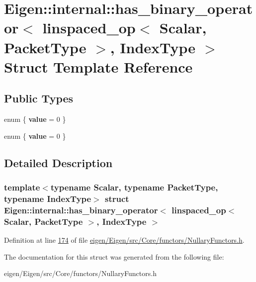 \hypertarget{struct_eigen_1_1internal_1_1has__binary__operator_3_01linspaced__op_3_01_scalar_00_01_packet_type_01_4_00_01_index_type_01_4}{}\section{Eigen\+:\+:internal\+:\+:has\+\_\+binary\+\_\+operator$<$ linspaced\+\_\+op$<$ Scalar, Packet\+Type $>$, Index\+Type $>$ Struct Template Reference}
\label{struct_eigen_1_1internal_1_1has__binary__operator_3_01linspaced__op_3_01_scalar_00_01_packet_type_01_4_00_01_index_type_01_4}
\subsection*{Public Types}
\begin{DoxyCompactItemize}
\item 
\mbox{\label{struct_eigen_1_1internal_1_1has__binary__operator_3_01linspaced__op_3_01_scalar_00_01_packet_type_01_4_00_01_index_type_01_4_aa55a2eeba226fddf3a4f283ab353f970}} 
enum \{ {\bfseries value} = 0
 \}
\item 
\mbox{\label{struct_eigen_1_1internal_1_1has__binary__operator_3_01linspaced__op_3_01_scalar_00_01_packet_type_01_4_00_01_index_type_01_4_a6f6b7e41992f658c997396013d93896b}} 
enum \{ {\bfseries value} = 0
 \}
\end{DoxyCompactItemize}


\subsection{Detailed Description}
\subsubsection*{template$<$typename Scalar, typename Packet\+Type, typename Index\+Type$>$\newline
struct Eigen\+::internal\+::has\+\_\+binary\+\_\+operator$<$ linspaced\+\_\+op$<$ Scalar, Packet\+Type $>$, Index\+Type $>$}



Definition at line \hyperlink{eigen_2_eigen_2src_2_core_2functors_2_nullary_functors_8h_source_l00174}{174} of file \hyperlink{eigen_2_eigen_2src_2_core_2functors_2_nullary_functors_8h_source}{eigen/\+Eigen/src/\+Core/functors/\+Nullary\+Functors.\+h}.



The documentation for this struct was generated from the following file\+:\begin{DoxyCompactItemize}
\item 
eigen/\+Eigen/src/\+Core/functors/\+Nullary\+Functors.\+h\end{DoxyCompactItemize}
